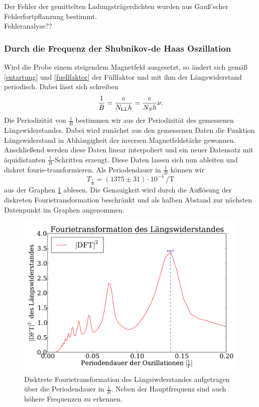 \documentclass[paper=a4,fontsize=10pt,DIV=18,twocolumn,parskip=half]{scrartcl}
\numberwithin{equation}{section}    %
\renewcommand{\note}[1]{{\color{red}#1??}}
\begin{document}
Der Fehler der gemittelten Ladungsträgerdichten wurden aus Gauß'scher Fehlerfortpflanzung bestimmt.\\
\note{Fehleranalyse}

\subsubsection*{Durch die Frequenz der Shubnikov-de Haas Oszillation}
Wird die Probe einem steigendem Magnetfeld ausgesetzt, so ändert sich gemäß \eqref{entartung} und \eqref{fuellfaktor} der Füllfaktor und mit ihm der Längswiderstand periodisch. Dabei lässt sich schreiben
\begin{equation}
\frac{1}{B}=\frac{e}{N_{\rm LL} h}=\frac{e}{N_S h} \nu.
\end{equation}
Die Periodizität von $\frac{1}{B}$ bestimmen wir aus der Periodizität des gemessenen Längswiderstandes. Dabei wird zunächst aus den gemessenen Daten die Funktion Längswiderstand in Abhängigkeit der inversen Magnetfeldstärke gewonnen. Anschließend werden diese Daten linear interpoliert und ein neuer Datensatz mit äquidistanten $\frac{1}{B}$-Schritten erzeugt. Diese Daten lassen sich nun ableiten und diskret fourie-transformieren. Als Periodendauer in $\frac{1}{B}$ können wir
\begin{equation}
T_{\frac{1}{B}}=(1375\pm 31) \cdot 10^{-4}\SI{}{\per\tesla}
\label{periodizitaet}
\end{equation}
aus der Graphen \ref{fft} ablesen. Die Genauigkeit wird durch die Auflösung der diskreten Fourietransformation beschränkt und als halben Abstand zur nächsten Datenpunkt im Graphen angenommen.

\begin{figure}[]
	\begin{center}
		\includegraphics[width=\columnwidth]{Data-Plots/06-Fourietransformation.pdf}
		\caption{Disktrete Fourietransformation des Längsiwderstandes aufgetragen über die Periodendauer in $\frac{1}{B}$. Neben der Hauptfrequenz sind auch höhere Frequenzen zu erkennen.}
		\label{fft}
	\end{center}
\end{figure}
\end{document}
